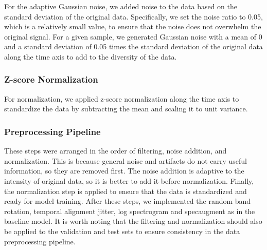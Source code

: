 For the adaptive Gaussian noise, we added noise to the data based on the standard deviation of the original data.
Specifically, we set the noise ratio to 0.05, which is a relatively small value, to ensure that the noise does not overwhelm the original signal.
For a given sample, we generated Gaussian noise with a mean of 0 and a standard deviation of 0.05 times the standard deviation of the original data
along the time axis to add to the diversity of the data.

\subsubsection{Z-score Normalization}

For normalization, we applied z-score normalization along the time axis to 
standardize the data by subtracting the mean and scaling it to unit variance.

\subsubsection{Preprocessing Pipeline}

These steps were arranged in the order of filtering, noise addition, and normalization.
This is because general noise and artifacts do not carry useful information, so they are removed first.
The noise addition is adaptive to the intensity of original data, so it is better to add it before normalization.
Finally, the normalization step is applied to ensure that the data is standardized and ready for model training.
After these steps, we implemented the random band rotation, temporal alignment jitter, 
log spectrogram and specaugment as in the baseline model.
It is worth noting that the filtering and normalization should also be applied to the validation and test sets to ensure consistency in the data preprocessing pipeline.
